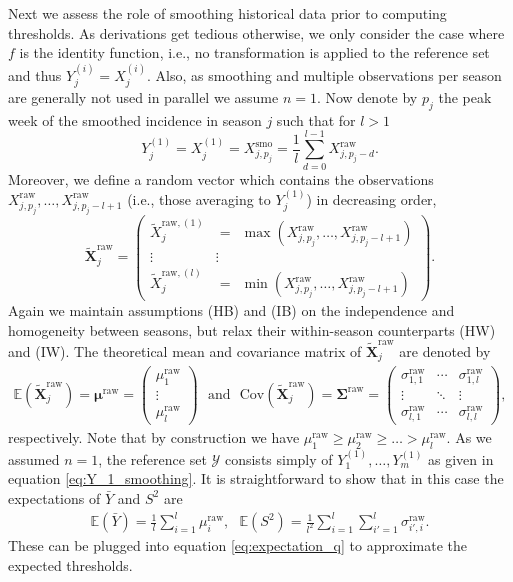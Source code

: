 \documentclass[12pt]{article}
\begin{document}
Next we assess the role of smoothing historical data prior to computing thresholds. As derivations get tedious otherwise, we only consider the case where $f$ is the identity function, i.e., no transformation is applied to the reference set and thus $
Y^{(i)}_j = X^{(i)}_j$. Also, as smoothing and multiple observations per season are generally not used in parallel we assume $n = 1$. Now denote by $p_j$ the peak week of the smoothed incidence in season $j$ such that for $l > 1$
\begin{equation}
Y_j^{(1)} =  X_j^{(1)} = X^{\text{smo}}_{j, p_j} = \frac{1}{l} \sum_{d = 0}^{l - 1} X^{\text{raw}}_{j, p_j - d}.\label{eq:Y_1_smoothing}
\end{equation}
Moreover, we define a random vector which contains the observations $X^{\text{raw}}_{j, p_j}, \dots, X^{\text{raw}}_{j, p_j - l + 1}$ (i.e., those averaging to $Y_j^{(1)}$) in decreasing order,
$$
\tilde{\mathbf{X}}^\text{raw}_j = \begin{pmatrix} \tilde{X}_j^{\text{raw}, (1)} & = \ \ \max(X^{\text{raw}}_{j, p_j}, \dots, X^{\text{raw}}_{j, p_j - l + 1}) \\ \vdots & \vdots \\ \tilde{X}_j^{\text{raw}, (l)} & = \ \ \min(X^{\text{raw}}_{j, p_j}, \dots, X^{\text{raw}}_{j, p_j - l + 1}) \end{pmatrix}.
$$
Again we maintain assumptions (HB) and (IB) on the independence and homogeneity between seasons, but relax their within-season counterparts (HW) and (IW). The theoretical mean and covariance matrix of $\tilde{\mathbf{X}}^\text{raw}_j$ are denoted by
\begin{align}
\mathbb{E}\left(\tilde{\mathbf{X}}^\text{raw}_j\right) = \boldsymbol{\mu}^\text{raw} = \left(\begin{array}{c}
\mu^\text{raw}_1\\
\vdots\\
\mu^\text{raw}_l
\end{array}\right) \ \ \ \text{and} \ \ \ \text{Cov}\left(\tilde{\mathbf{X}}^\text{raw}_j\right) = \boldsymbol{\Sigma}^\text{raw} =
\left(\begin{array}{ccc}
\sigma^\text{raw}_{1, 1} & \cdots & \sigma^\text{raw}_{1, l}\\
\vdots & \ddots &\vdots\\
\sigma^\text{raw}_{l, 1} & \cdots & \sigma^\text{raw}_{l, l}
\end{array}\right),
\end{align}
respectively. Note that by construction we have $\mu^\text{raw}_1 \geq \mu^\text{raw}_2 \geq \dots > \mu^\text{raw}_l$. As we assumed $n = 1$, the reference set $\mathcal{Y}$ consists simply of $Y^{(1)}_1, \dots, Y^{(1)}_m$ as given in equation \eqref{eq:Y_1_smoothing}. It is straightforward to show that in this case the expectations of $\bar{Y}$ and $S^2$ are
\begin{align}
\mathbb{E}(\bar{Y}) = \frac{1}{l} \sum_{i = 1}^l \mu^\text{raw}_i, \ \ \ 
\mathbb{E}(S^2) = \frac{1}{l^2} \sum_{i = 1}^l \sum_{i' = 1}^l \sigma^\text{raw}_{i', i}.
\label{eq:expectation_moments_smoothing}
\end{align}
These can be plugged into equation \eqref{eq:expectation_q} to approximate the expected thresholds. 
\end{document}

